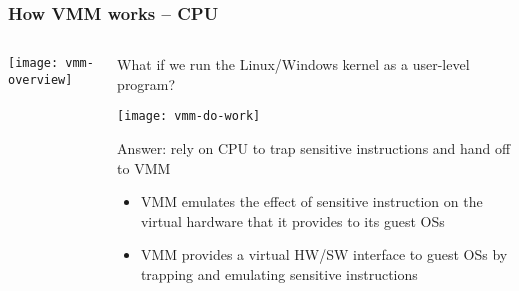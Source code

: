 \begin{frame}[plain]
	\frametitle{How VMM works  -- CPU}
	
	
	
	\begin{columns}
		
		\begin{column}{.25\textwidth}
			
			\texttt{[image: vmm-overview]}
			
		\end{column}
		
		\begin{column}{.75\textwidth}
			
			What if we run the Linux/Windows kernel as a user-level program?	
			
			\centering
			\texttt{[image: vmm-do-work]}	
			\begin{flushleft}
			Answer: rely on CPU to trap sensitive instructions and hand off to VMM
			\end{flushleft}
			\begin{itemize}
				\item VMM emulates the effect of sensitive instruction on the virtual hardware that it provides to its guest OSs 
				\item VMM provides a virtual HW/SW interface to guest OSs by trapping and emulating sensitive instructions 
				
			\end{itemize} 
			
		\end{column}
		
		
	\end{columns}
	
	
\end{frame}



